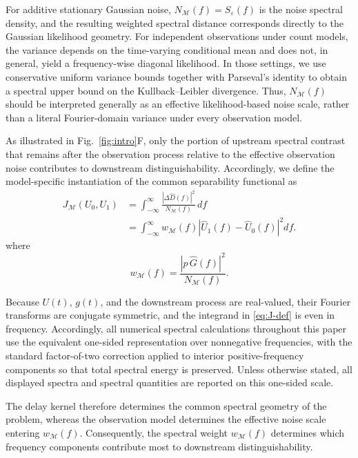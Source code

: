 For additive stationary Gaussian noise, \(N_{\mathcal M}(f)=S_\varepsilon(f)\) is the noise spectral density, and the
resulting weighted spectral distance corresponds directly to the Gaussian likelihood geometry. For independent observations under count models, the variance depends on the time-varying conditional mean and does not, in general, yield a frequency-wise diagonal likelihood. In those settings, we use conservative
uniform variance bounds together with Parseval's identity to obtain a spectral upper bound on the Kullback--Leibler divergence. Thus, \(N_{\mathcal M}(f)\) should be interpreted generally as an effective likelihood-based noise scale, rather than a literal Fourier-domain variance under every observation model.

As illustrated in Fig.~\ref{fig:intro}F, only the portion of upstream spectral contrast that remains after the observation process relative to the effective observation noise contributes to downstream distinguishability. Accordingly, we define the model-specific instantiation of the common separability
functional as
\begin{equation}
\begin{aligned}
J_{\mathcal M}(U_0,U_1)
&=
\int_{-\infty}^{\infty}
\frac{|\Delta\widehat D(f)|^2}
     {N_{\mathcal M}(f)}
\,df
\\[4pt]
&=
\int_{-\infty}^{\infty}
w_{\mathcal M}(f)
\left|
\widehat U_1(f)-\widehat U_0(f)
\right|^2df.
\end{aligned}
\label{eq:J-def}
\end{equation}
where
\[
w_{\mathcal M}(f)
=
\frac{|p\,\widehat G(f)|^2}{N_{\mathcal M}(f)}.
\]

Because \(U(t)\), \(g(t)\), and the downstream process are real-valued, their Fourier transforms are conjugate symmetric, and the integrand in \eqref{eq:J-def} is even in frequency. Accordingly, all numerical spectral calculations throughout this paper use the equivalent one-sided representation over nonnegative frequencies, with the standard factor-of-two correction applied to interior positive-frequency components so that total spectral energy is preserved. Unless otherwise stated, all displayed spectra and spectral quantities are reported on this one-sided scale.

The delay kernel therefore determines the common spectral geometry of the problem, whereas the observation model determines the effective noise scale entering \(w_{\mathcal M}(f)\). Consequently, the spectral weight \(w_{\mathcal M}(f)\) determines which frequency components contribute most to downstream distinguishability.


